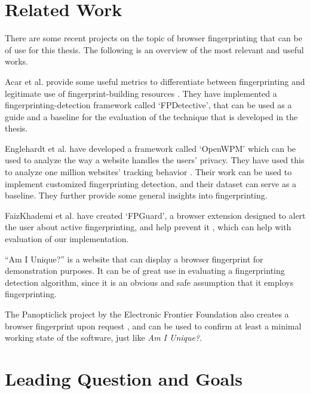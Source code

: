 \documentclass[
    fontsize=12pt,
    headings=small,
    parskip=half,
    bibliography=totoc,
    numbers=noenddot,
    open=any
    ]{scrreprt}
\begin{document}

\begingroup
\renewcommand{\cleardoublepage}{}
\renewcommand{\clearpage}{}
\chapter{Related Work} %
\endgroup

There are some recent projects on the topic of browser fingerprinting that can be of use for this thesis.
The following is an overview of the most relevant and useful works.

Acar et al. provide some useful metrics to differentiate between fingerprinting and legitimate use of
fingerprint-building resources \cite{DBLP:conf/ccs/AcarJNDGPP13}. They have implemented a fingerprinting-detection
framework called `FPDetective', that can be used as a guide and a baseline for the evaluation of the technique that is developed
in the thesis.

Englehardt et al. have developed a framework called `OpenWPM' which can be used to analyze the way a website
handles the users' privacy. They have used this to analyze one million websites' tracking behavior
\cite{DBLP:conf/ccs/EnglehardtN16}. Their work can be used to implement customized fingerprinting detection,
and their dataset can serve as a baseline. They further provide some general insights into fingerprinting.

FaizKhademi et al. have created `FPGuard', a browser extension designed to alert the user about active
fingerprinting, and help prevent it \cite{faizkhademi2015fpguard}, which can help with evaluation of our
implementation.

``Am I Unique?'' \cite{am_i_unique} is a website that can display a browser fingerprint for demonstration
purposes. It can be of great use in evaluating a fingerprinting detection algorithm, since it is an obvious and
safe assumption that it employs fingerprinting.

The Panopticlick project by the Electronic Frontier Foundation also creates a browser fingerprint upon request
\cite{panopticlick},
and can be used to confirm at least a minimal working state of the software, just like \textit{Am I Unique?}.


\begingroup
\renewcommand{\cleardoublepage}{}
\renewcommand{\clearpage}{}
\chapter{Leading Question and Goals} %
\endgroup
\end{document}

